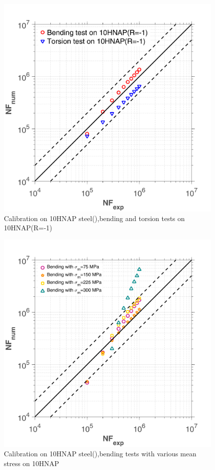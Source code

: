 \begin{figure}[!h]
	\centering
	\includegraphics[width=\textwidth]{figures//10HNAP_bt1D_err.png} 
	\caption{Calibration on 10HNAP steel(\cite{jabbado:pastel-00002116}),bending and torsion tests on 10HNAP(R=-1)}
	\label{fig.10HNAP1}
\end{figure}
\begin{figure}[!h]
	\centering
	\includegraphics[width=\textwidth]{figures//10HNAP_b1D_m_err.png} 
	\caption{Calibration on 10HNAP steel(\cite{jabbado:pastel-00002116}),bending tests with various mean stress on 10HNAP}
	\label{fig.10HNAP2}
\end{figure}


